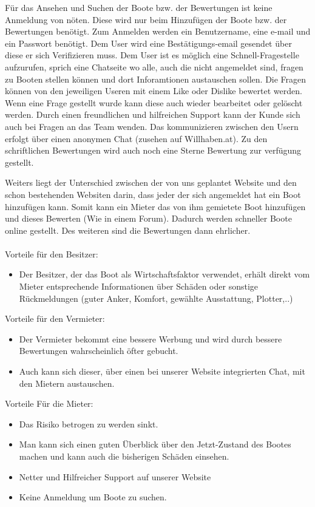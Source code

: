 \documentclass[12pt]{article}
\theoremstyle{definition}
\begin{document}
Für das Ansehen und Suchen der Boote bzw. der Bewertungen ist keine Anmeldung von nöten. Diese wird nur beim Hinzufügen der Boote bzw. der Bewertungen benötigt.
Zum Anmelden werden ein Benutzername, eine e-mail und ein Passwort benötigt. Dem User wird eine Bestätigungs-email gesendet über diese er sich Verifizieren muss. 
Dem User ist es möglich eine Schnell-Fragestelle aufzurufen, sprich eine Chatseite wo alle, auch die nicht angemeldet sind, fragen zu Booten stellen können und dort Inforamtionen austauschen sollen. Die Fragen können von den jeweiligen Useren mit einem Like oder Dislike bewertet werden. Wenn eine Frage gestellt wurde kann diese auch wieder bearbeitet oder gelöscht werden.
Durch einen freundlichen und hilfreichen Support kann der Kunde sich auch bei Fragen an das Team wenden.
Das kommunizieren zwischen den Usern erfolgt über einen anonymen Chat (zusehen auf Willhaben.at). Zu den schriftlichen Bewertungen wird auch noch eine Sterne Bewertung zur verfügung gestellt.  

Weiters liegt der Unterschied zwischen der von uns geplantet Website und den schon bestehenden Websiten darin, dass jeder der sich angemeldet hat ein Boot hinzufügen kann. Somit kann ein Mieter das von ihm gemietete Boot hinzufügen und dieses Bewerten (Wie in einem Forum). Dadurch werden schneller Boote online gestellt. Des weiteren sind die Bewertungen dann ehrlicher.\\\\
Vorteile für den Besitzer:
\begin{itemize}
\item Der Besitzer, der das Boot als Wirtschaftsfaktor verwendet, erhält direkt vom Mieter entsprechende Informationen über Schäden oder sonstige Rückmeldungen (guter Anker, Komfort, gewählte Ausstattung, Plotter,..)
\end{itemize}
Vorteile für den Vermieter:
\begin{itemize}
\item Der Vermieter bekommt eine bessere Werbung und wird durch bessere Bewertungen wahrscheinlich öfter gebucht.
\item Auch kann sich dieser, über einen bei unserer Website integrierten Chat, mit den Mietern austauschen.
\end{itemize}
Vorteile Für die Mieter:
\begin{itemize}
\item Das Risiko betrogen zu werden sinkt.
\item Man kann sich einen guten Überblick über den Jetzt-Zustand des Bootes machen und kann auch die bisherigen Schäden einsehen.
\item Netter und Hilfreicher Support auf unserer Website
\item Keine Anmeldung um Boote zu suchen.
\end{itemize}
\end{document}
